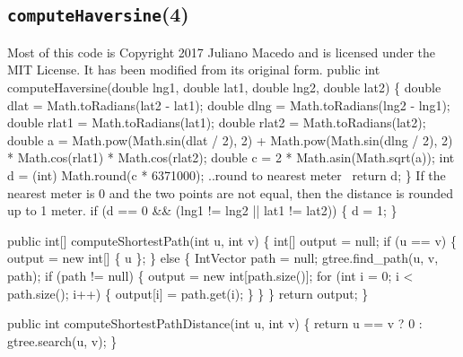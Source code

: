 \documentclass{article}
\def\nwendcode{\endtrivlist \endgroup}      %
\let\nwdocspar=\par
\begin{document}
\subsection{{\tt{}\protect{}computeHaversine}(4)}
Most of this code is Copyright 2017 Juliano Macedo and is licensed under the
MIT License. It has been modified from its original form.
\nwenddocs{}\endmoddef{}
public int computeHaversine(double lng1, double lat1, double lng2, double lat2) \{
  double dlat = Math.toRadians(lat2 - lat1);
  double dlng = Math.toRadians(lng2 - lng1);
  double rlat1 = Math.toRadians(lat1);
  double rlat2 = Math.toRadians(lat2);
  double a = Math.pow(Math.sin(dlat / 2), 2)
    + Math.pow(Math.sin(dlng / 2), 2)
    * Math.cos(rlat1) * Math.cos(rlat2);
  double c = 2 * Math.asin(Math.sqrt(a));
  int d = (int) Math.round(c * 6371000);
  \LA{}..round to nearest meter~{\nwtagstyle{}}\RA{}
  return d;
\}
\eatline
{}\nwendcode{}If the nearest meter is 0 and the two points are not equal, then the distance
is rounded up to 1 meter.
\nwenddocs{}\endmoddef{}
if (d == 0 && (lng1 != lng2 || lat1 != lat2)) \{
  d = 1;
\}
\nwendcode{}\nwdocspar

\nwenddocs{}\endmoddef{}
public int[] computeShortestPath(int u, int v) \{
  int[] output = null;
  if (u == v) \{
    output = new int[] \{ u \};
  \} else \{
    IntVector path = null;
    gtree.find_path(u, v, path);
    if (path != null) \{
      output = new int[path.size()];
      for (int i = 0; i < path.size(); i++) \{
        output[i] = path.get(i);
      \}
    \}
  \}
  return output;
\}
\eatline
{}\nwendcode{}\nwdocspar
\nwenddocs{}\endmoddef{}
public int computeShortestPathDistance(int u, int v) \{
  return u == v ? 0 : gtree.search(u, v);
\}
\nwendcode{}
\end{document}
